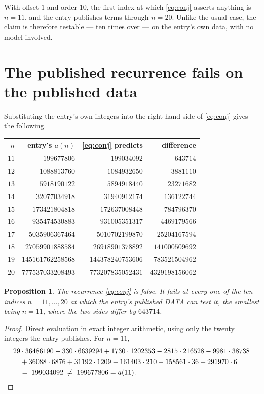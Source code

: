 \documentclass[11pt,a4paper]{article}
\theoremstyle{plain}
\newtheorem{proposition}[theorem]{Proposition}
\theoremstyle{definition}
\begin{document}
With offset $1$ and order $10$, the first index at which \eqref{eq:conj} asserts anything
is $n=11$, and the entry publishes terms through $n=20$. Unlike the usual case, the claim
is therefore testable --- ten times over --- on the entry's own data, with no model
involved.

\section{The published recurrence fails on the published data}

Substituting the entry's own integers into the right-hand side of \eqref{eq:conj} gives
the following.

\begin{center}\small
\begin{tabular}{rrrr}
\toprule
$n$ & entry's $a(n)$ & \eqref{eq:conj} predicts & difference \\
\midrule
$11$ & $199677806$ & $199034092$ & $643714$\\
$12$ & $1088813760$ & $1084932650$ & $3881110$\\
$13$ & $5918190122$ & $5894918440$ & $23271682$\\
$14$ & $32077034918$ & $31940912174$ & $136122744$\\
$15$ & $173421804818$ & $172637008448$ & $784796370$\\
$16$ & $935474530883$ & $931005351317$ & $4469179566$\\
$17$ & $5035906367464$ & $5010702199870$ & $25204167594$\\
$18$ & $27059901888584$ & $26918901378892$ & $141000509692$\\
$19$ & $145161762258568$ & $144378240753606$ & $783521504962$\\
$20$ & $777537033208493$ & $773207835052431$ & $4329198156062$\\
\bottomrule
\end{tabular}
\end{center}

\begin{proposition}
The recurrence \eqref{eq:conj} is false. It fails at every one of the ten indices
$n=11,\dots,20$ at which the entry's published DATA can test it, the smallest being
$n=11$, where the two sides differ by $643714$.
\end{proposition}

\begin{proof}
Direct evaluation in exact integer arithmetic, using only the twenty integers the entry
publishes. For $n=11$,
\begin{align*}
&29\cdot36486190 - 330\cdot6639294 + 1730\cdot1202353 - 2815\cdot216528 - 9981\cdot38738\\
&\quad{}+ 36088\cdot6876 + 31192\cdot1209 - 161403\cdot210 - 158561\cdot36 + 291970\cdot6\\
&\quad=\;199034092\;\ne\;199677806=a(11).\qedhere
\end{align*}
\end{proof}
\end{document}
